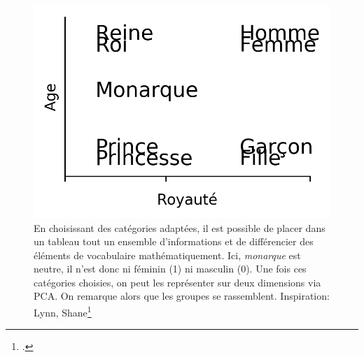 \begin{figure}[h]
    \centering
    \noindent\begin{minipage}{.45\linewidth}
    \end{minipage}
    \begin{minipage}{.45\linewidth}
        \includegraphics[width=\linewidth]{figures/chap2/visualisation_embedding.png}
    \end{minipage}
    \caption{En choisissant des catégories adaptées, il est possible de placer dans un tableau tout un ensemble d'informations et de différencier des éléments de vocabulaire mathématiquement. Ici, \textit{monarque} est neutre, il n'est donc ni féminin (1) ni masculin (0). Une fois ces catégories choisies, on peut les représenter sur deux dimensions via PCA. On remarque alors que les groupes se rassemblent. Inspiration: Lynn, Shane\footcite{lynn_get_2018}}
    \label{figure:deep-learning:projection-embedding}
\end{figure}